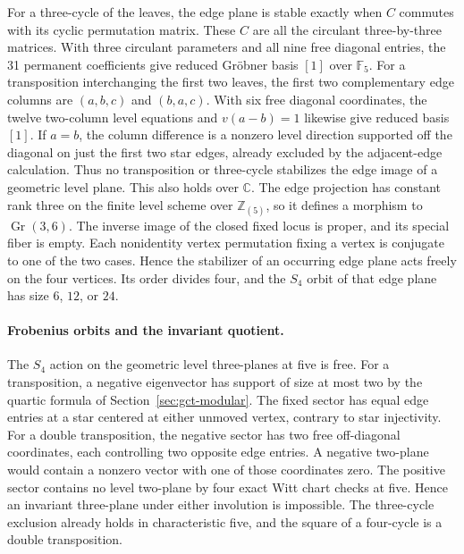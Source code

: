 For a three-cycle of the leaves, the edge plane is stable exactly
when \(C\) commutes with its cyclic permutation matrix. These \(C\)
are all the circulant three-by-three matrices. With three circulant
parameters and all nine free diagonal entries, the 31 permanent
coefficients give reduced Gr\"obner basis \([1]\) over \(\mathbb F_5\).
For a transposition interchanging the first two leaves, the first
two complementary edge columns are \((a,b,c)\) and \((b,a,c)\).
With six free diagonal coordinates, the twelve two-column level
equations and \(v(a-b)=1\) likewise give reduced basis \([1]\).
If \(a=b\), the column difference is a nonzero level direction
supported off the diagonal on just the first two star edges, already
excluded by the adjacent-edge calculation. Thus no transposition
or three-cycle stabilizes the edge image of a geometric level plane.
This also holds over \(\mathbb C\). The edge
projection has constant rank three on the finite level scheme
over \(\mathbb Z_{(5)}\), so it defines a morphism to
\(\operatorname{Gr}(3,6)\). The inverse image of the closed fixed
locus is proper, and its special fiber is empty. Each nonidentity
vertex permutation fixing a vertex is conjugate to one of the
two cases. Hence the stabilizer of an occurring edge plane acts
freely on the four vertices. Its order divides four, and the
\(S_4\) orbit of that edge plane has size \(6\), \(12\), or \(24\).

\paragraph{Frobenius orbits and the invariant quotient.}
The \(S_4\) action on the geometric level three-planes at five is
free. For a transposition, a negative eigenvector has support
of size at most two by the quartic formula of
Section~\ref{sec:gct-modular}. The fixed sector has equal edge
entries at a star centered at either unmoved vertex, contrary
to star injectivity. For a double transposition, the negative
sector has two free off-diagonal coordinates, each controlling
two opposite edge entries. A negative two-plane would contain a
nonzero vector with one of those coordinates zero. The positive
sector contains no level two-plane by four exact Witt chart
checks at five. Hence an invariant three-plane under either
involution is impossible. The three-cycle exclusion already
holds in characteristic five, and the square of a four-cycle
is a double transposition.

